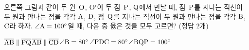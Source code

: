 \noindent\begin{minipage}[t]{0.58\linewidth}\vspace{0pt}\raggedright 오른쪽 그림과 같이 두 원~$\mathrm{O}$, $\mathrm{O'}$이 두 점~$\mathrm{P}$, $\mathrm{Q}$에서 만날 때, 점~$\mathrm{P}$를 지나는 직선이 두 원과 만나는 점을 각각 $\mathrm{A}$, $\mathrm{D}$, 점~$\mathrm{Q}$를 지나는 직선이 두 원과 만나는 점을 각각 $\mathrm{B}$, $\mathrm{C}$라 하자. $\angle\mathrm{A}=100^\circ$일 때, 다음 중 옳은 것을 모두 고르면? (정답 2개)\end{minipage}\hfill\begin{minipage}[t]{0.4\linewidth}\vspace{0pt}\centering \resizebox{\ifdim\width>\linewidth\linewidth\else\width\fi}{!}{}\end{minipage}\par
\begin{choicesii}{$\overline{\mathrm{AB}}\parallel\overline{\mathrm{PQ}}$}{$\overline{\mathrm{AB}}\parallel\overline{\mathrm{CD}}$}{$\angle\mathrm{B}=80^\circ$}{$\angle\mathrm{PDC}=80^\circ$}{$\angle\mathrm{BQP}=100^\circ$}\end{choicesii}
